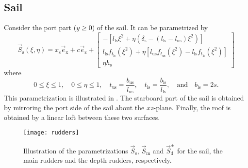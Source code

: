 \subsection{Sail}
Consider the port part ($y\geq 0$) of the sail. It can be parametrized by
\begin{equation}\label{Eq3:sail}
	\vec{S}_{\mathrm{s}}(\xi,\eta) = x_{\mathrm{s}}\vec{e}_{\mathrm{x}} + c\vec{e}_{\mathrm{z}} + \begin{bmatrix}
	-\left[l_{\mathrm{ls}} \xi^2+\eta\left(\delta_{\mathrm{s}}-(l_{\mathrm{ls}}-l_{\mathrm{us}})\xi^2\right)\right]\\
	l_{\mathrm{ls}}f_{t_{\mathrm{ls}}}(\xi^2) + \eta\left[l_{\mathrm{us}}f_{t_{\mathrm{us}}}(\xi^2)-l_{\mathrm{ls}}f_{t_{\mathrm{ls}}}(\xi^2)\right]\\
	\eta h_{\mathrm{s}}
	\end{bmatrix}
\end{equation}
where
\begin{equation*}
	0\leq \xi\leq 1,\quad 0\leq \eta \leq 1,\quad t_{\mathrm{us}}=\frac{b_{\mathrm{us}}}{l_{\mathrm{us}}},\quad t_{\mathrm{ls}}=\frac{b_{\mathrm{ls}}}{l_{\mathrm{ls}}},\quad\text{and}\quad b_{\mathrm{ls}}=2s.
\end{equation*}
This parametrization is illustrated in . The starboard part of the sail is obtained by mirroring the port side of the sail about the $xz$-plane. Finally, the roof is obtained by a linear loft between these two surfaces.
\begin{figure}
	\centering
	\texttt{[image: rudders]}
	\caption{Illustration of the parametrizations $\vec{S}_{\mathrm{s}}$, $\vec{S}_{\mathrm{m}}$ and $\vec{S}_{\mathrm{d}}^\pm$ for the sail, the main rudders and the depth rudders, respectively.}
	\label{Fig3:rudders}
\end{figure}


